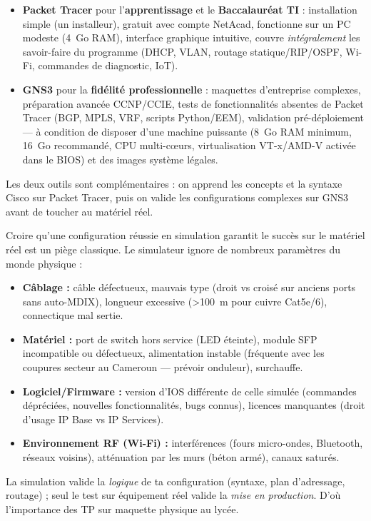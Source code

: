 \documentclass[11pt]{article}
\begin{document}
\begin{aretenir}
\begin{itemize}
    \item \textbf{Packet Tracer} pour l'\textbf{apprentissage} et le \textbf{Baccalauréat TI} : installation simple (un installeur), gratuit avec compte NetAcad, fonctionne sur un PC modeste (\SI{4}{Go} RAM), interface graphique intuitive, couvre \emph{intégralement} les savoir-faire du programme (DHCP, VLAN, routage statique/RIP/OSPF, Wi-Fi, commandes de diagnostic, IoT).
    \item \textbf{GNS3} pour la \textbf{fidélité professionnelle} : maquettes d'entreprise complexes, préparation avancée CCNP/CCIE, tests de fonctionnalités absentes de Packet Tracer (BGP, MPLS, VRF, scripts Python/EEM), validation pré-déploiement — à condition de disposer d'une machine puissante (\SI{8}{Go} RAM minimum, \SI{16}{Go} recommandé, CPU multi-cœurs, virtualisation VT-x/AMD-V activée dans le BIOS) et des images système légales.
\end{itemize}
Les deux outils sont complémentaires : on apprend les concepts et la syntaxe Cisco sur Packet Tracer, puis on valide les configurations complexes sur GNS3 avant de toucher au matériel réel.
\end{aretenir}

\begin{attention}
Croire qu'une configuration réussie en simulation garantit le succès sur le matériel réel est un piège classique. Le simulateur ignore de nombreux paramètres du monde physique :
\begin{itemize}
    \item \textbf{Câblage :} câble défectueux, mauvais type (droit vs croisé sur anciens ports sans auto-MDIX), longueur excessive (\textgreater \SI{100}{m} pour cuivre Cat5e/6), connectique mal sertie.
    \item \textbf{Matériel :} port de switch hors service (LED éteinte), module SFP incompatible ou défectueux, alimentation instable (fréquente avec les coupures secteur au Cameroun — prévoir onduleur), surchauffe.
    \item \textbf{Logiciel/Firmware :} version d'IOS différente de celle simulée (commandes dépréciées, nouvelles fonctionnalités, bugs connus), licences manquantes (droit d'usage IP Base vs IP Services).
    \item \textbf{Environnement RF (Wi-Fi) :} interférences (fours micro-ondes, Bluetooth, réseaux voisins), atténuation par les murs (béton armé), canaux saturés.
\end{itemize}
La simulation valide la \emph{logique} de ta configuration (syntaxe, plan d'adressage, routage) ; seul le test sur équipement réel valide la \emph{mise en production}. D'où l'importance des TP sur maquette physique au lycée.
\end{attention}
\end{document}
